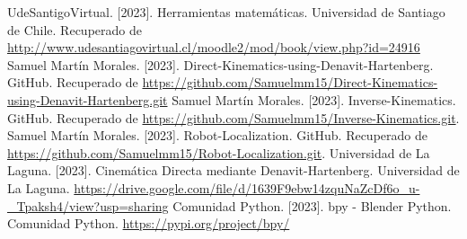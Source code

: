 \documentclass[11pt]{report}
\begin{document}
\begin{thebibliography}{99}
   UdeSantigoVirtual. [2023]. Herramientas matemáticas. Universidad de Santiago de Chile. Recuperado de \url{http://www.udesantiagovirtual.cl/moodle2/mod/book/view.php?id=24916}
   Samuel Martín Morales. [2023]. Direct-Kinematics-using-Denavit-Hartenberg. GitHub. Recuperado de \url{https://github.com/Samuelmm15/Direct-Kinematics-using-Denavit-Hartenberg.git}
   Samuel Martín Morales. [2023]. Inverse-Kinematics. GitHub. Recuperado de \url{https://github.com/Samuelmm15/Inverse-Kinematics.git}.
   Samuel Martín Morales. [2023]. Robot-Localization. GitHub. Recuperado de \url{https://github.com/Samuelmm15/Robot-Localization.git}.
   Universidad de La Laguna. [2023]. Cinemática Directa mediante Denavit-Hartenberg. Universidad de La Laguna. \url{https://drive.google.com/file/d/1639F9ebw14zquNaZcDf6o_u-_Tpaksh4/view?usp=sharing}
   Comunidad Python. [2023]. bpy - Blender Python. Comunidad Python. \url{https://pypi.org/project/bpy/}
\end{thebibliography}
\end{document}
